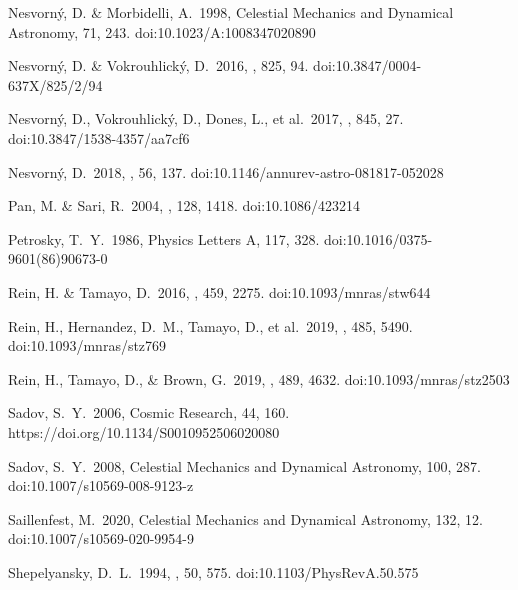 \documentclass[twocolumn]{aastex62}
\begin{document}
\begin{thebibliography}{00}

 Nesvorn{\'y}, D. \& Morbidelli, A.\ 1998, Celestial Mechanics and Dynamical Astronomy, 71, 243. doi:10.1023/A:1008347020890

 Nesvorn{\'y}, D. \& Vokrouhlick{\'y}, D.\ 2016, \apj, 825, 94. doi:10.3847/0004-637X/825/2/94

 Nesvorn{\'y}, D., Vokrouhlick{\'y}, D., Dones, L., et al.\ 2017, \apj, 845, 27. doi:10.3847/1538-4357/aa7cf6

 Nesvorn{\'y}, D.\ 2018, \araa, 56, 137. doi:10.1146/annurev-astro-081817-052028



 Pan, M. \& Sari, R.\ 2004, \aj, 128, 1418. doi:10.1086/423214

 Petrosky, T.~Y.\ 1986, Physics Letters A, 117, 328. doi:10.1016/0375-9601(86)90673-0




 Rein, H. \& Tamayo, D.\ 2016, \mnras, 459, 2275. doi:10.1093/mnras/stw644

 Rein, H., Hernandez, D.~M., Tamayo, D., et al.\ 2019, \mnras, 485, 5490. doi:10.1093/mnras/stz769

 Rein, H., Tamayo, D., \& Brown, G.\ 2019, \mnras, 489, 4632. doi:10.1093/mnras/stz2503



 Sadov, S.~Y.\ 2006, Cosmic Research, 44, 160. https://doi.org/10.1134/S0010952506020080

 Sadov, S.~Y.\ 2008, Celestial Mechanics and Dynamical Astronomy, 100, 287. doi:10.1007/s10569-008-9123-z

 Saillenfest, M.\ 2020, Celestial Mechanics and Dynamical Astronomy, 132, 12. doi:10.1007/s10569-020-9954-9

 Shepelyansky, D.~L.\ 1994, \pra, 50, 575. doi:10.1103/PhysRevA.50.575


\end{thebibliography}
\end{document}
